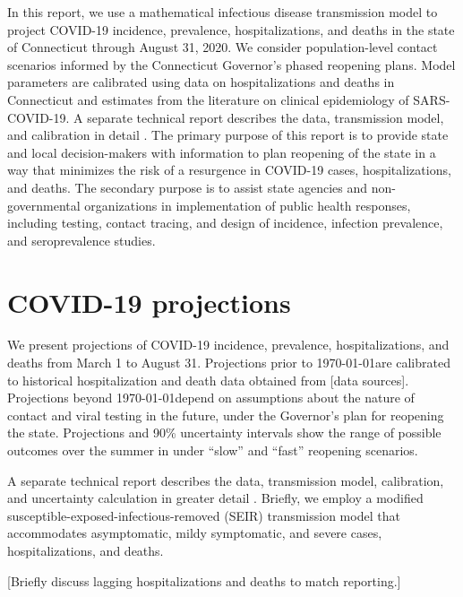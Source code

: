 \documentclass[11pt]{article}
\begin{document}

In this report, we use a mathematical infectious disease transmission model to project COVID-19 incidence, prevalence, hospitalizations, and deaths in the state of Connecticut through August 31, 2020.  We consider population-level contact scenarios informed by the Connecticut Governor's phased reopening plans.  Model parameters are calibrated using data on hospitalizations and deaths in Connecticut and estimates from the literature on clinical epidemiology of SARS-COVID-19.  A separate technical report describes the data, transmission model, and calibration in detail \citep{morozova2020tech}.  The primary purpose of this report is to provide state and local decision-makers with information to plan reopening of the state in a way that minimizes the risk of a resurgence in COVID-19 cases, hospitalizations, and deaths.  The secondary purpose is to assist state agencies and non-governmental organizations in implementation of public health responses, including testing, contact tracing, and design of incidence, infection prevalence, and seroprevalence studies. 





\section*{COVID-19 projections} 

We present projections of COVID-19 incidence, prevalence, hospitalizations, and deaths from March 1 to August 31.  Projections prior to \today are calibrated to historical hospitalization and death data obtained from [data sources].  Projections beyond \today depend on assumptions about the nature of contact and viral testing in the future, under the Governor's plan for reopening the state.  Projections and 90\% uncertainty intervals show the range of possible outcomes over the summer in under ``slow'' and ``fast'' reopening scenarios.  

A separate technical report describes the data, transmission model, calibration, and uncertainty calculation in greater detail \citep{morozova2020tech}.  Briefly, we employ a modified susceptible-exposed-infectious-removed (SEIR) transmission model that accommodates asymptomatic, mildy symptomatic, and severe cases, hospitalizations, and deaths.  

[Briefly discuss lagging hospitalizations and deaths to match reporting.]
\end{document}
